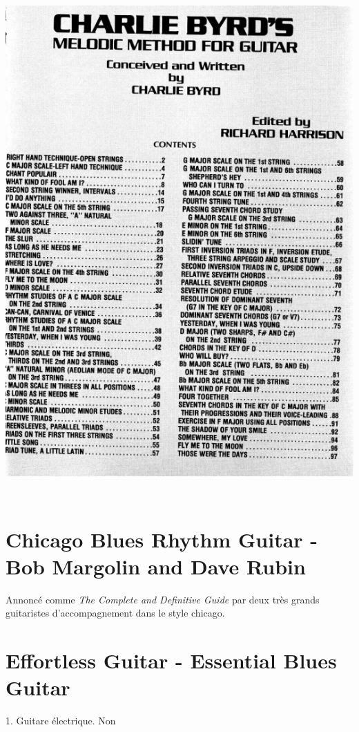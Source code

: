 \documentclass[a4paper]{book}
\begin{document}
\begin{center}
\includegraphics[width=14.444cm,height=19.496cm]{lebluessupportsmethodes-img60.png}
\end{center}

\clearpage\section{Chicago Blues Rhythm Guitar - Bob Margolin and Dave Rubin}
Annoncé comme \emph{The Complete and Definitive Guide} par deux très grands guitaristes d'accompagnement dans le style chicago.


\clearpage


\section[Effortless Guitar {}- Essential Blues Guitar ]{Effortless
Guitar - Essential Blues Guitar }
\hypertarget{RefHeadingToc132973218262}{}1. Guitare \'electrique. Non
\end{document}
